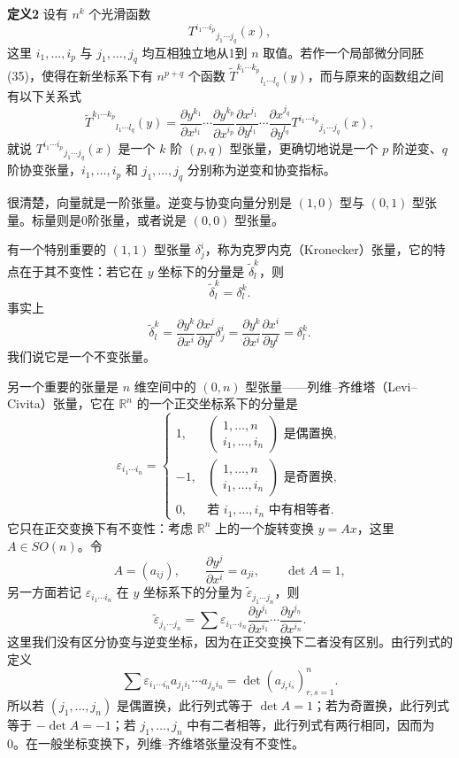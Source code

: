 \noindent\textbf{定义2}\quad
设有 $n^k$ 个光滑函数
\[
 T^{i_1\cdots i_p}{}_{j_1\cdots j_q}(x),
\]
这里 $i_1,\ldots,i_p$ 与 $j_1,\ldots,j_q$ 均互相独立地从1到 $n$ 取值。若作一个局部微分同胚(35)，使得在新坐标系下有 $n^{p+q}$ 个函数 $\widetilde T^{k_1\cdots k_p}{}_{l_1\cdots l_q}(y)$，而与原来的函数组之间有以下关系式
\begin{equation}
 \widetilde T^{k_1\cdots k_p}{}_{l_1\cdots l_q}(y)
 =\frac{\partial y^{k_1}}{\partial x^{i_1}}\cdots
 \frac{\partial y^{k_p}}{\partial x^{i_p}}
 \frac{\partial x^{j_1}}{\partial y^{l_1}}\cdots
 \frac{\partial x^{j_q}}{\partial y^{l_q}}
 T^{i_1\cdots i_p}{}_{j_1\cdots j_q}(x),
 \tag{41}
\end{equation}
就说 $T^{i_1\cdots i_p}{}_{j_1\cdots j_q}(x)$ 是一个 $k$ 阶 $(p,q)$ 型张量，更确切地说是一个 $p$ 阶逆变、$q$ 阶协变张量，$i_1,\ldots,i_p$ 和 $j_1,\ldots,j_q$ 分别称为逆变和协变指标。

很清楚，向量就是一阶张量。逆变与协变向量分别是 $(1,0)$ 型与 $(0,1)$ 型张量。标量则是0阶张量，或者说是 $(0,0)$ 型张量。

有一个特别重要的 $(1,1)$ 型张量 $\delta^i_j$，称为克罗内克（Kronecker）张量，它的特点在于其不变性：若它在 $y$ 坐标下的分量是 $\widetilde\delta^k_l$，则
\[
 \widetilde\delta^k_l=\delta^k_l.
\]
事实上
\[
 \widetilde\delta^k_l
 =\frac{\partial y^k}{\partial x^i}\frac{\partial x^j}{\partial y^l}\delta^i_j
 =\frac{\partial y^k}{\partial x^i}\frac{\partial x^i}{\partial y^l}
 =\delta^k_l.
\]
我们说它是一个不变张量。

另一个重要的张量是 $n$ 维空间中的 $(0,n)$ 型张量——列维--齐维塔（Levi--Civita）张量，它在 $\mathbb R^n$ 的一个正交坐标系下的分量是
\begin{equation}
 \varepsilon_{i_1\cdots i_n}=
 \begin{cases}
 1,&\begin{pmatrix}1,\ldots,n\\i_1,\ldots,i_n\end{pmatrix}\text{ 是偶置换},\\[3pt]
 -1,&\begin{pmatrix}1,\ldots,n\\i_1,\ldots,i_n\end{pmatrix}\text{ 是奇置换},\\[3pt]
 0,&\text{若 }i_1,\ldots,i_n\text{ 中有相等者}.
 \end{cases}
 \tag{42}
\end{equation}
它只在正交变换下有不变性：考虑 $\mathbb R^n$ 上的一个旋转变换 $y=Ax$，这里 $A\in SO(n)$。令
\[
 A=(a_{ij}),\qquad \frac{\partial y^j}{\partial x^i}=a_{ji},\qquad \det A=1,
\]
另一方面若记 $\varepsilon_{i_1\cdots i_n}$ 在 $y$ 坐标系下的分量为 $\widetilde\varepsilon_{j_1\cdots j_n}$，则
\[
 \widetilde\varepsilon_{j_1\cdots j_n}
 =\sum\varepsilon_{i_1\cdots i_n}
 \frac{\partial y^{j_1}}{\partial x^{i_1}}\cdots
 \frac{\partial y^{j_n}}{\partial x^{i_n}}.
\]
这里我们没有区分协变与逆变坐标，因为在正交变换下二者没有区别。由行列式的定义
\[
 \sum\varepsilon_{i_1\cdots i_n}a_{j_1i_1}\cdots a_{j_ni_n}
 =\det(a_{j_ri_s})_{r,s=1}^n.
\]
所以若 $(j_1,\ldots,j_n)$ 是偶置换，此行列式等于 $\det A=1$；若为奇置换，此行列式等于 $-\det A=-1$；若 $j_1,\ldots,j_n$ 中有二者相等，此行列式有两行相同，因而为0。在一般坐标变换下，列维--齐维塔张量没有不变性。

